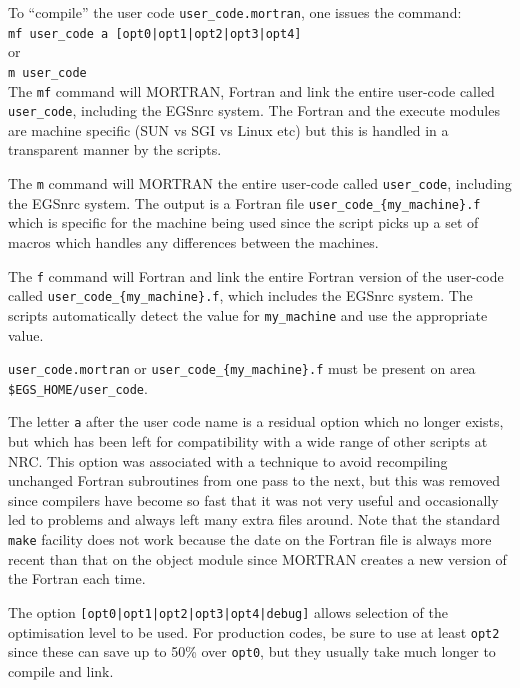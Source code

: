 To ``compile'' the user code {\tt user\_code.mortran}, one issues the command:\\
\verb+mf user_code a [opt0|opt1|opt2|opt3|opt4]+\\
or\\
\verb+m user_code+\\

The \verb+mf+ command will MORTRAN, Fortran and link the
entire user-code called \verb+user_code+, including the EGSnrc
system.  The Fortran and the execute modules are machine specific (SUN vs
SGI vs Linux etc) but this is handled in a transparent manner by the scripts.

The \verb+m+ command will MORTRAN the entire user-code
called \verb+user_code+, including the EGSnrc system. The output is
a Fortran file \verb+user_code_{my_machine}.f+ which is specific for the
machine being used since the script picks up a set of macros which
handles any differences between the machines.

The \verb+f+ command will Fortran and link the entire
Fortran version of the user-code called
\verb+user_code_{my_machine}.f+, which includes the EGSnrc system.
The scripts automatically detect the value for \verb+my_machine+ and use
the appropriate value.

\verb+user_code.mortran+ or \verb+user_code_{my_machine}.f+
must be present on area \\
\verb+$EGS_HOME/user_code+.

The letter {\tt a} after the user code name is a residual option which no
longer exists, but which has been left for compatibility with
a wide range of other scripts at NRC.  This option was associated with a
technique to avoid recompiling unchanged Fortran subroutines from one pass
to the next, but this was removed since compilers have become so fast that
it was not very useful and occasionally led to problems and always left
many extra files around. Note that  the
standard \verb+make+ facility does not work because the date on the Fortran
file is
always more recent than that on the object module since MORTRAN creates
a new version of the Fortran each time.


The option \verb+[opt0|opt1|opt2|opt3|opt4|debug]+ allows selection of
the optimisation level to be used.  For production codes, be sure to use
at least \verb+opt2+ since these can save up to 50\% over
\verb+opt0+, but they usually take much longer to compile and link.

